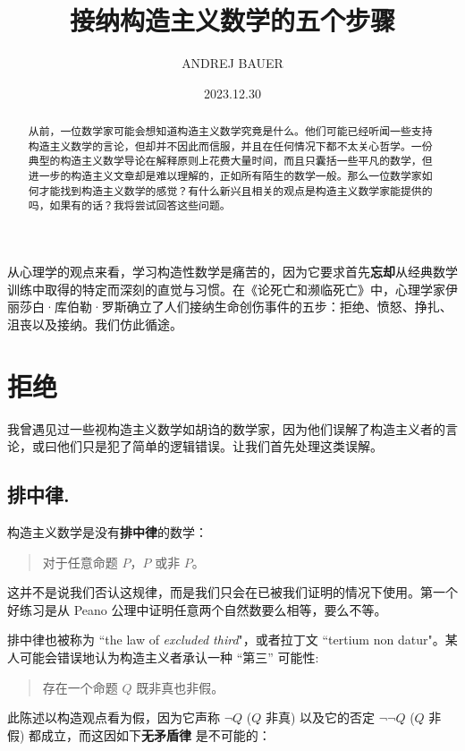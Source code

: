 \documentclass{ctexart}
\title{\LARGE 接纳构造主义数学的五个步骤}
\author{ANDREJ BAUER}
\date{2023.12.30}
\begin{document}
\maketitle

  \begin{abstract}
    从前，一位数学家可能会想知道构造主义数学究竟是什么。他们可能已经听闻一些支持构造主义数学的言论，但却并不因此而信服，并且在任何情况下都不太关心哲学。一份典型的构造主义数学导论在解释原则上花费大量时间，而且只囊括一些平凡的数学，但进一步的构造主义文章却是难以理解的，正如所有陌生的数学一般。那么一位数学家如何才能找到构造主义数学的感觉？有什么新兴且相关的观点是构造主义数学家能提供的吗，如果有的话？我将尝试回答这些问题。
  \end{abstract}

  \tableofcontents

  

  从心理学的观点来看，学习构造性数学是痛苦的，因为它要求首先\textbf{忘却}从经典数学训练中取得的特定而深刻的直觉与习惯。在《论死亡和濒临死亡》中，心理学家伊丽莎白·库伯勒·罗斯确立了人们接纳生命创伤事件的五步：拒绝、愤怒、挣扎、沮丧以及接纳。我们仿此循途。

  \section{拒绝}
    我曾遇见过一些视构造主义数学如胡诌的数学家，因为他们误解了构造主义者的言论，或曰他们只是犯了简单的逻辑错误。让我们首先处理这类误解。
    \subsection{排中律.} 
      构造主义数学是没有\textbf{排中律}的数学：
      
        \begin{quote}
          对于任意命题 \( P \)，\( P \) 或非 \( P \)。
        \end{quote}
    
      这并不是说我们否认这规律，而是我们只会在已被我们证明的情况下使用。第一个好练习是从 Peano 公理中证明任意两个自然数要么相等，要么不等。  

      排中律也被称为 ``the law of \emph{excluded third}"，或者拉丁文 ``tertium non datur"。某人可能会错误地认为构造主义者承认一种 “第三” 可能性:

        \begin{quote}
            存在一个命题 \( Q \) 既非真也非假。
        \end{quote}

      此陈述以构造观点看为假，因为它声称 \( \neg Q \) (\( Q \) 非真) 以及它的否定 \( \neg \neg Q \) (\( Q \) 非假) 都成立，而这因如下\textbf{无矛盾律} 是不可能的：
\end{document}
